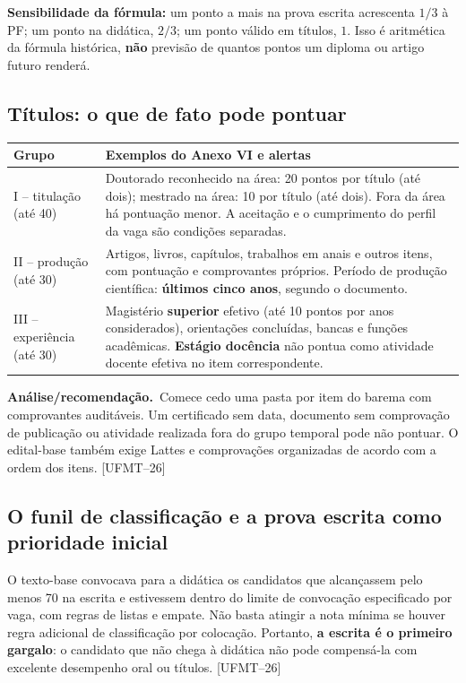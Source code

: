 \documentclass[11pt,a4paper]{article}
\newcommand{\infer}{\textbf{Análise/recomendação.}~}
\newcommand{\fufmt}{\textsf{[UFMT--26]}}
\begin{document}
\textbf{Sensibilidade da fórmula:} um ponto a mais na prova escrita acrescenta $1/3$ à PF; um ponto na didática, $2/3$; um ponto válido em títulos, $1$. Isso é aritmética da fórmula histórica, \textbf{não} previsão de quantos pontos um diploma ou artigo futuro renderá.

\subsection{Títulos: o que de fato pode pontuar}
\begin{tabularx}{\textwidth}{p{}X}
\toprule
\textbf{Grupo} & \textbf{Exemplos do Anexo VI e alertas}\\\midrule
I -- titulação (até 40) & Doutorado reconhecido na área: 20 pontos por título (até dois); mestrado na área: 10 por título (até dois). Fora da área há pontuação menor. A aceitação e o cumprimento do perfil da vaga são condições separadas.\\
II -- produção (até 30) & Artigos, livros, capítulos, trabalhos em anais e outros itens, com pontuação e comprovantes próprios. Período de produção científica: \textbf{últimos cinco anos}, segundo o documento.\\
III -- experiência (até 30) & Magistério \textbf{superior} efetivo (até 10 pontos por anos considerados), orientações concluídas, bancas e funções acadêmicas. \textbf{Estágio docência} não pontua como atividade docente efetiva no item correspondente.\\\bottomrule
\end{tabularx}

\infer Comece cedo uma pasta por item do barema com comprovantes auditáveis. Um certificado sem data, documento sem comprovação de publicação ou atividade realizada fora do grupo temporal pode não pontuar. O edital-base também exige Lattes e comprovações organizadas de acordo com a ordem dos itens. \fufmt

\subsection{O funil de classificação e a prova escrita como prioridade inicial}
O texto-base convocava para a didática os candidatos que alcançassem pelo menos 70 na escrita e estivessem dentro do limite de convocação especificado por vaga, com regras de listas e empate. Não basta atingir a nota mínima se houver regra adicional de classificação por colocação. Portanto, \textbf{a escrita é o primeiro gargalo}: o candidato que não chega à didática não pode compensá-la com excelente desempenho oral ou títulos. \fufmt
\end{document}
